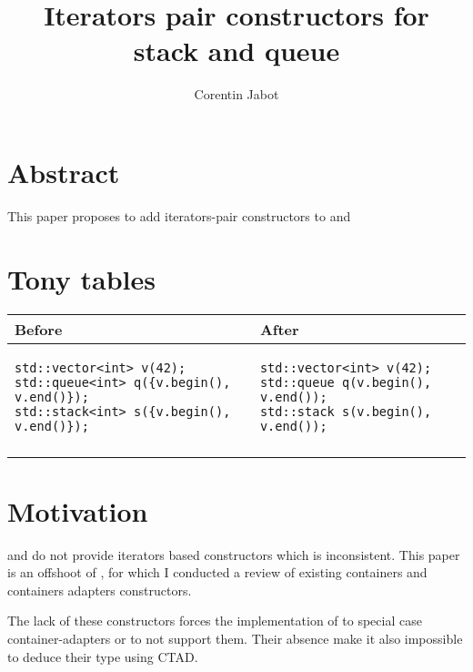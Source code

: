 \documentclass{wg21}
\title{Iterators pair constructors for stack and queue}
\author{Corentin Jabot}{corentin.jabot@gmail.com}
\begin{document}
\maketitle

\section{Abstract}

This paper proposes to add iterators-pair constructors to  and 

\section{Tony tables}
\begin{center}
\begin{tabular}{l|l}
Before & After\\ \hline

\begin{minipage}[t]{0.5\textwidth}
\begin{verbatim}
std::vector<int> v(42);
std::queue<int> q({v.begin(), v.end()});
std::stack<int> s({v.begin(), v.end()});
\end{verbatim}
\end{minipage}
&
\begin{minipage}[t]{0.3\textwidth}
\begin{verbatim}
std::vector<int> v(42);
std::queue q(v.begin(), v.end());
std::stack s(v.begin(), v.end());
\end{verbatim}
\end{minipage}
\\\\ \hline

\end{tabular}
\end{center}


\section{Motivation}

 and  do not provide iterators based constructors which is inconsistent.
This paper is an offshoot of \cite{P1206}, for which I conducted a review of existing containers and containers adapters constructors.

The lack of these constructors forces the implementation of  to special case container-adapters or to not support them.
Their absence make it also impossible to deduce their type using CTAD.
\end{document}
